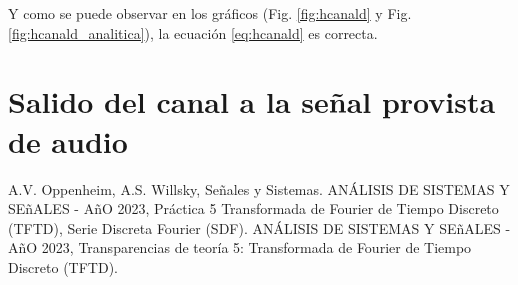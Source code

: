 \documentclass[letterpaper, 10 pt, conference]{ieeeconf}  %
\begin{document}
Y como se puede observar en los gr\'aficos (Fig. \ref{fig:hcanald} y Fig. \ref{fig:hcanald_analitica}), la ecuaci\'on \ref{eq:hcanald} es correcta.

\section{Salido del canal a la señal provista de audio}


\begin{thebibliography}{99}
  
A.V. Oppenheim, A.S. Willsky, Se\~nales y Sistemas.
ANÁLISIS DE SISTEMAS Y SE\~{n}ALES - A\~{n}O 2023, Práctica 5 Transformada de Fourier de Tiempo Discreto (TFTD), Serie Discreta Fourier (SDF).
ANÁLISIS DE SISTEMAS Y SE\~{n}ALES - A\~{n}O 2023, Transparencias de teor\'ia 5: Transformada de Fourier de Tiempo Discreto (TFTD).

\end{thebibliography}
\end{document}

